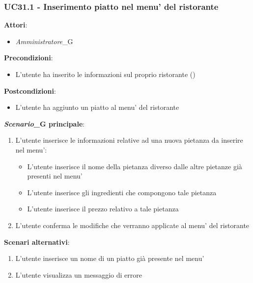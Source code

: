 \subsubsection{UC31.1 - Inserimento piatto nel menu' del ristorante}\label{usecase:31_1}
\textbf{Attori}:
\begin{itemize}
    \item \textit{Amministratore}_G
\end{itemize}
\textbf{Precondizioni}:
\begin{itemize}
    \item L'utente ha inserito le informazioni sul proprio ristorante ()
\end{itemize}
\textbf{Postcondizioni}:
\begin{itemize}
    \item L’utente ha aggiunto un piatto al menu’ del ristorante
\end{itemize}
\textbf{\textit{Scenario}_G principale}:
\begin{enumerate}
    \item L'utente inserisce le informazioni relative ad una nuova pietanza da inserire nel menu':
    \begin{itemize}
        \item L'utente inserisce il nome della pietanza diverso dalle altre pietanze già presenti nel menu'
        \item L'utente inserisce gli ingredienti che compongono tale pietanza
        \item L'utente inserisce il prezzo relativo a tale pietanza
    \end{itemize}
    \item L'utente conferma le modifiche che verranno applicate al menu' del ristorante
\end{enumerate}
\textbf{Scenari alternativi}: 
\begin{enumerate}
    \item L'utente inserisce un nome di un piatto già presente nel menu'
    \item L'utente visualizza un messaggio di errore
\end{enumerate}